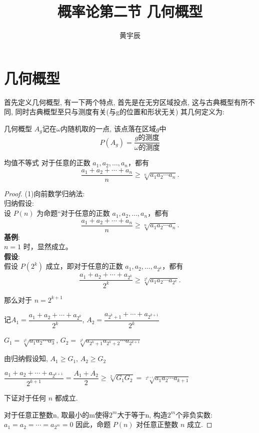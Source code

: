 \documentclass{MathNoteCN}
\title{概率论第二节 几何概型}
\author{黄宇辰}
\begin{document}
	\maketitle
	\section{几何概型}
	首先定义几何概型, 有一下两个特点, 首先是在无穷区域投点, 这与古典概型有所不同, 同时古典概型至只与测度有关(与g的位置和形状无关)
	其几何定义为:
	\begin{definition}{几何概型}{}
		$A_g$记在$\omega$内随机取的一点, 该点落在区域$g$中
		\[
		P(A_g)=\frac{g \text{的测度}}{\omega\text{的测度}}
		\]
	\end{definition}
	\begin{theorem}{均值不等式}{}
		对于任意的正数 $ a_1, a_2, \ldots, a_n $，都有
		\[\frac{a_1 + a_2 + \cdots + a_n}{n} \geq \sqrt[n]{a_1 a_2 \cdots a_n}.\]
	\end{theorem}
	\begin{proof}
		(1)向前数学归纳法: \\
		归纳假设: \\
		设 $ P(n) $ 为命题“对于任意的正数 $ a_1, a_2, \ldots, a_n $，都有
		\[\frac{a_1 + a_2 + \cdots + a_n}{n} \geq \sqrt[n]{a_1 a_2 \cdots a_n}.\]
		\textbf{基例}: \\
		$ n=1 $ 时，显然成立。\\
		\textbf{假设}: \\
		假设 $ P(2^{k}) $ 成立，即对于任意的正数 $ a_1, a_2, \ldots, a_{2^k} $，都有
		\[\frac{a_1 + a_2 + \cdots + a_{2^k}}{2^k} \geq \sqrt[2^k]{a_1 a_2 \cdots a_{2^k}}.\]

		那么对于 $ n=2^{k+1} $

        记$A_1=\dfrac{a_1+a_2+\cdots + a_{2^k}}{2^k}$, $A_2=\dfrac{a_{2^k+1}+\cdots + a_{2^{k+1}}}{2^k}$
        
        $G_1=\sqrt[2^k]{a_1a_2\cdots a_3}$, $G_2=\sqrt[2^k]{a_{2^k+1}a_{2^k+2}\cdots a_{2^{k+1}}}$
		
        由归纳假设知, $A_1 \geq G_1$, $A_2 \geq G_2$

        $\dfrac{a_1+a_2+\cdots + a_{2^{k+1}}}{2^{k+1}}=\dfrac{A_1+A_2}{2} \geq \sqrt[2]{G_1G_2}=\sqrt[2^{k+1}]{a_1a_2\cdots a_{k+1}}$

        下证对于任何 $n$ 都成立.

        对于任意正整数n, 取最小的m使得$2^m$大于等于n, 构造$2^m$个非负实数: 
        $a_1=a_2=\cdots =a_{2^m}=0$
        因此，命题 $ P(n) $ 对任意正整数 $ n $ 成立. 
	\end{proof}
\end{document}
